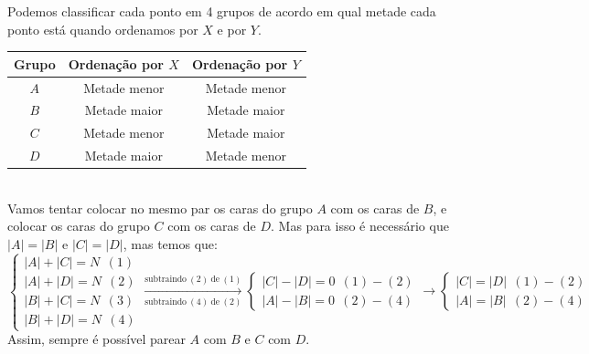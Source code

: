 Podemos classificar cada ponto em 4 grupos de acordo em qual metade cada ponto está quando ordenamos por $X$ e por $Y$.
\begin{table}[h]
    \centering
    \begin{tabular}{|c|c|c|}
    \hline
    \textbf{Grupo} & \textbf{Ordenação por $X$} & \textbf{Ordenação por $Y$} \\ \hline
    $A$ & Metade menor & Metade menor \\ \hline
    $B$ & Metade maior & Metade maior \\ \hline
    $C$ & Metade menor & Metade maior \\ \hline
    $D$ & Metade maior & Metade menor \\ \hline
    \end{tabular}
\end{table} \\
Vamos tentar colocar no mesmo par os caras do grupo $A$ com os caras de $B$, e colocar os caras do grupo $C$ com os caras de $D$. Mas para isso é necessário que $|A| = |B|$ e $|C| = |D|$, mas temos que:
\[
\begin{cases}
    |A| + |C| = N ~~(1)\\
    |A| + |D| = N ~~(2)\\
    |B| + |C| = N ~~(3)\\
    |B| + |D| = N ~~(4)
\end{cases} \xrightarrow[\text{subtraindo}~(4)~\text{de}~(2)]{\text{subtraindo}~(2)~\text{de}~(1)}
\begin{cases}
    |C|-|D| = 0 ~~(1)-(2) \\
    |A|-|B| = 0 ~~(2)-(4)
\end{cases} \rightarrow
\begin{cases}
    |C| = |D| ~~(1)-(2) \\
    |A| = |B| ~~(2)-(4)
\end{cases}
\]
Assim, sempre é possível parear $A$ com $B$ e $C$ com $D$.

